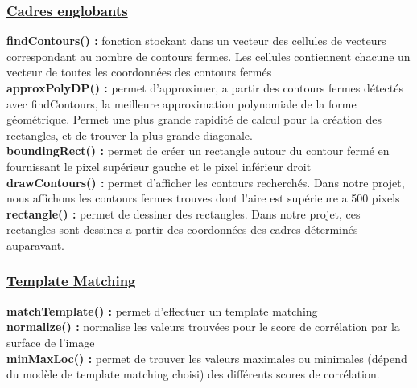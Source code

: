 \documentclass[10pt,a4paper]{report}
\begin{document}
\subsubsection{\underline{Cadres englobants}}
\textbf{findContours() :} fonction stockant dans un vecteur des cellules de vecteurs correspondant au nombre de contours fermes. Les cellules contiennent chacune un vecteur de toutes les coordonnées des contours fermés\\
\newline
\textbf{approxPolyDP() :} permet d'approximer, a partir des contours fermes détectés avec findContours, la meilleure approximation polynomiale de la forme géométrique. Permet une plus grande rapidité de calcul pour la création des rectangles, et de trouver la plus grande diagonale.\\
\newline
\textbf{boundingRect() :} permet de créer un rectangle autour du contour fermé en fournissant le pixel supérieur gauche et le pixel inférieur droit\\
\newline
\textbf{drawContours() :} permet d'afficher les contours recherchés. Dans notre projet, nous affichons les contours fermes trouves dont l'aire est supérieure a 500 pixels\\
\newline
\textbf{rectangle() :} permet de dessiner des rectangles. Dans notre projet, ces rectangles sont dessines a partir des coordonnées des cadres déterminés auparavant.\\
\subsubsection{\underline{Template Matching}}
\textbf{matchTemplate() :} permet d'effectuer un template matching\\
\newline
\textbf{normalize() :} normalise les valeurs trouvées pour le score de corrélation par la surface de l'image\\
\newline
\textbf{minMaxLoc() :} permet de trouver les valeurs maximales ou minimales (dépend du modèle de template matching choisi) des différents scores de corrélation.
\end{document}

